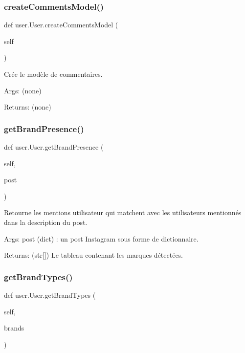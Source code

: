 \subsubsection{\texorpdfstring{create\+Comments\+Model()}{createCommentsModel()}}
{\footnotesize\ttfamily def user.\+User.\+create\+Comments\+Model (\begin{DoxyParamCaption}\item[{}]{self }\end{DoxyParamCaption})}

\begin{DoxyVerb}Crée le modèle de commentaires.

Args:
    (none)

Returns:
    (none)
\end{DoxyVerb}
 \mbox{\label{classuser_1_1_user_a5269972e3c641c50202185b171fe904b}} 
\subsubsection{\texorpdfstring{get\+Brand\+Presence()}{getBrandPresence()}}
{\footnotesize\ttfamily def user.\+User.\+get\+Brand\+Presence (\begin{DoxyParamCaption}\item[{}]{self,  }\item[{}]{post }\end{DoxyParamCaption})}

\begin{DoxyVerb}Retourne les mentions utilisateur qui matchent avec les utilisateurs mentionnés dans la description du post.

Args:
    post (dict) : un post Instagram sous forme de dictionnaire.

Returns:
    (str[]) Le tableau contenant les marques détectées.
\end{DoxyVerb}
 \mbox{\label{classuser_1_1_user_a3fd64901698b59210a03be44ff5123e8}} 
\subsubsection{\texorpdfstring{get\+Brand\+Types()}{getBrandTypes()}}
{\footnotesize\ttfamily def user.\+User.\+get\+Brand\+Types (\begin{DoxyParamCaption}\item[{}]{self,  }\item[{}]{brands }\end{DoxyParamCaption})}

